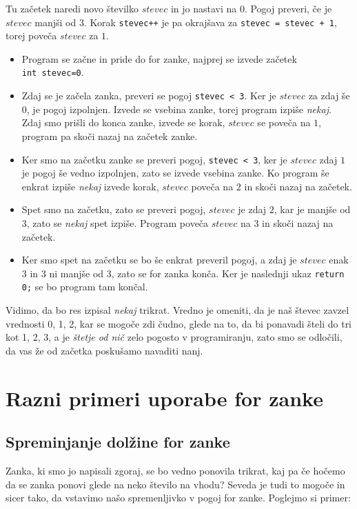 \documentclass{article}
\begin{document}
Tu začetek naredi novo številko $stevec$ in jo nastavi na $0$.
Pogoj preveri, če je $stevec$ manjši od $3$. Korak \texttt{stevec++} je pa
okrajšava za \texttt{stevec = stevec + 1}, torej poveča $stevec$ za $1$.

\begin{itemize}
	\item Program se začne in pride do for zanke,
	najprej se izvede začetek \texttt{int~stevec=0}.
	\item Zdaj se je začela zanka, preveri se pogoj \texttt{stevec~<~3}.
	Ker je $stevec$ za zdaj še $0$, je pogoj izpolnjen. Izvede se vsebina zanke,
	torej program izpiše \emph{nekaj}. Zdaj smo prišli do konca zanke,
	izvede se korak, $stevec$ se poveča na $1$, program pa skoči nazaj na
	začetek zanke.
	\item Ker smo na začetku zanke se preveri pogoj, \texttt{stevec~<~3},
	ker je $stevec$ zdaj $1$ je pogoj še vedno izpolnjen, zato se izvede
	vsebina zanke. Ko program še enkrat izpiše \emph{nekaj} izvede korak,
	$stevec$ poveča na $2$ in skoči nazaj na začetek.
	\item Spet smo na začetku, zato se preveri pogoj, $stevec$ je zdaj $2$,
	kar je manjše od $3$, zato se \emph{nekaj} spet izpiše. Program poveča
	$stevec$ na $3$ in skoči nazaj na začetek.
	\item Ker smo spet na začetku se bo še enkrat preveril pogoj,
	a zdaj je $stevec$ enak $3$ in $3$ ni manjše od $3$,
	zato se for zanka konča. Ker je naslednji ukaz \texttt{return 0;} se bo
	program tam končal.
\end{itemize}

Vidimo, da bo res izpisal \emph{nekaj} trikrat. Vredno je omeniti,
da je naš števec zavzel vrednosti 0, 1, 2, kar se mogoče zdi čudno, glede na
to, da bi ponavadi šteli do tri kot 1, 2, 3, a je \emph{štetje od nič} zelo
pogosto v programiranju, zato smo se odločili, da vas že od začetka poskušamo
navaditi nanj.

\section{Razni primeri uporabe for zanke}

\subsection{Spreminjanje dolžine for zanke}
Zanka, ki smo jo napisali zgoraj, se bo vedno ponovila trikrat,
kaj pa če hočemo da se zanka ponovi glede na neko število na vhodu?
Seveda je tudi to mogoče in sicer tako, da vstavimo našo spremenljivko v pogoj
for zanke. Poglejmo si primer:
\end{document}
